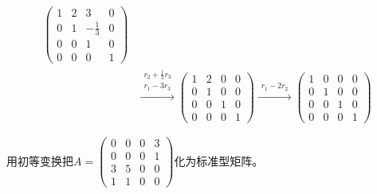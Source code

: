 \documentclass[a4paper]{report}
\begin{document}
\begin{jie}
\begin{align*}
{
\begin{pmatrix}
1&2&3&0\\
0&1&-\frac{1}{3}&0\\
0&0&1&0\\
0&0&0&1
\end{pmatrix}
}\\ &\xrightarrow{\substack{r_{2}+\frac{1}{3}r_{3}\\ r_{1}-3r_{3}}}
{
\begin{pmatrix}
1&2&0&0\\
0&1&0&0\\
0&0&1&0\\
0&0&0&1
\end{pmatrix}
}\xrightarrow{\substack{r_{1}-2r_{2}}}
{
\begin{pmatrix}
1&0&0&0\\
0&1&0&0\\
0&0&1&0\\
0&0&0&1
\end{pmatrix}
}
\end{align*}
\end{jie}

\EX 用初等变换把$
A=
\begin{pmatrix}
0&0&0&3\\
0&0&0&1\\
3&5&0&0\\
1&1&0&0
\end{pmatrix}
$化为标准型矩阵。
\end{document}
